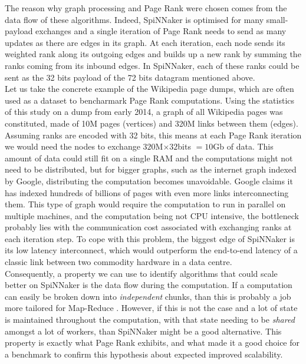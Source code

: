 The reason why graph processing and Page Rank were chosen comes from the data flow of these algorithms.  Indeed, SpiNNaker is optimised for many small-payload exchanges and a single iteration of Page Rank needs to send as many updates as there are edges in its graph. At each iteration, each node sends its weighted rank along its outgoing edges and builds up a new rank by summing the ranks coming from its inbound edges. In SpiNNaker, each of these ranks could be sent as the 32 bits payload of the 72 bits datagram mentioned above. \\

Let us take the concrete example of the Wikipedia page dumps, which are often used as a dataset to bencharmark Page Rank computations. Using the statistics of this study \cite{nayuki} on a dump from early 2014, a graph of all Wikipedia pages was constituted, made of 10M pages (vertices) and 320M links between them (edges). Assuming ranks are encoded with 32 bits, this means at each Page Rank iteration we would need the nodes to exchange $320$M$ \times  32 $bits $= 10$Gb of data. This amount of data could still fit on a single RAM and the computations might not need to be distributed, but for bigger graphs, such as the internet graph indexed by Google, distributing the computation becomes unavoidable. Google claims it has indexed hundreds of billions of pages \cite{google-si} with even more links interconnecting them. This type of graph would require the computation to run in parallel on multiple machines, and the computation being not CPU intensive, the bottleneck probably lies with the communication cost associated with exchanging ranks at each iteration step. To cope with this problem, the biggest edge of SpiNNaker is its low latency interconnect, which would outperform the end-to-end latency of a classic link between two commodity hardware in a data centre. \\


Consequently, a property we can use to identify algorithms that could scale better on SpiNNaker is the data flow during the computation. If a computation can easily be broken down into \textit{independent} chunks, than this is probably a job more tailored for Map-Reduce \cite{mr}. However, if this is not the case and a lot of state is maintained throughout the computation, with that state needing to be \textit{shared} amongst a lot of workers, than SpiNNaker might be a good alternative. This property is exactly what Page Rank exhibits, and what made it a good choice for a benchmark to confirm this hypothesis about expected improved scalability. \\


